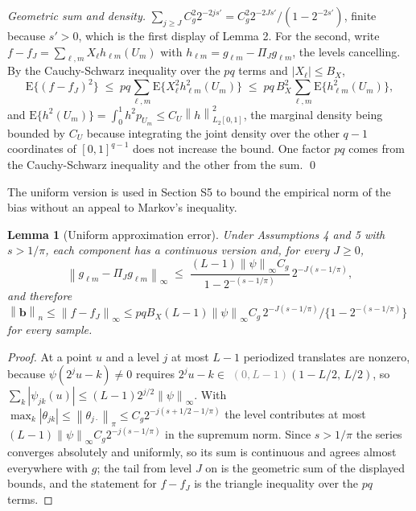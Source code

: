 \documentclass[10pt]{book}
\newtheorem{lemma}{Lemma}[section]
\theoremstyle{definition}
\newcommand{\E}{\mathrm{E}}
\newcommand{\norm}[1]{\left\lVert #1 \right\rVert}
\newcommand{\normn}[1]{\left\lVert #1 \right\rVert_{n}}
\newcommand{\cv}{\ell}
\newcommand{\md}{m}
\newcommand{\lev}{j}
\newcommand{\tsl}{k}
\newcommand{\gcomp}[2]{g_{#1#2}}
\newcommand{\wav}[2]{\psi_{#1#2}}
\newcommand{\PiJ}{\Pi_{J}}
\newcommand{\seff}{s'}
\newcommand{\bb}{\mathbf{b}}
\begin{document}
\emph{Geometric sum and density.}
$\sum_{\lev\ge J}C_g^2 2^{-2\lev\seff} = C_g^2 2^{-2J\seff}/(1-2^{-2\seff})$,
finite because $\seff > 0$, which is the first display of Lemma 2. For the
second, write $f-f_J = \sum_{\cv,\md}X_{\cv}h_{\cv\md}(U_{\md})$ with
$h_{\cv\md} = \gcomp{\cv}{\md}-\PiJ\gcomp{\cv}{\md}$, the levels cancelling.
By the Cauchy-Schwarz inequality over the $pq$ terms and
$|X_{\cv}| \le B_X$,
\[
  \E\{(f-f_J)^2\} \;\le\; pq\sum_{\cv,\md}
  \E\{X_{\cv}^2h_{\cv\md}^2(U_{\md})\}
  \;\le\; pq\,B_X^2\sum_{\cv,\md}\E\{h_{\cv\md}^2(U_{\md})\},
\]
and $\E\{h^2(U_{\md})\} = \int_0^1 h^2 p_{U_{\md}} \le C_U\norm{h}^2_{L_2[0,1]}$,
the marginal density being bounded by $C_U$ because integrating the joint
density over the other $q-1$ coordinates of $[0,1]^{q-1}$ does not increase
the bound. One factor $pq$ comes from the Cauchy-Schwarz inequality and the
other from the sum. \qed

The uniform version is used in Section S5 to bound the empirical norm of the
bias without an appeal to Markov's inequality.

\begin{lemma}[Uniform approximation error]
\label{lem:sup}
Under Assumptions 4 and 5 with $s > 1/\pi$, each component has a continuous
version and, for every $J \ge 0$,
\[
  \norm{\gcomp{\cv}{\md}-\PiJ\gcomp{\cv}{\md}}_{\infty}
  \;\le\; \frac{(L-1)\norm{\psi}_{\infty}C_g}{1-2^{-(s-1/\pi)}}\,
  2^{-J(s-1/\pi)} ,
\]
and therefore
$\normn{\bb} \le \norm{f-f_J}_{\infty} \le pq B_X(L-1)\norm{\psi}_{\infty}
C_g\,2^{-J(s-1/\pi)}/\{1-2^{-(s-1/\pi)}\}$ for every sample.
\end{lemma}

\begin{proof}
At a point $u$ and a level $\lev$ at most $L-1$ periodized translates are
nonzero, because $\psi(2^{\lev}u-\tsl)\ne0$ requires
$2^{\lev}u-\tsl \in{}$ \textcolor{gray}{\sout{$(0,L-1)$}}\textcolor{colR1}{$(1-L/2,\,L/2)$}, so
$\sum_{\tsl}|\wav{\lev}{\tsl}(u)| \le (L-1)2^{\lev/2}\norm{\psi}_{\infty}$.
With $\max_{\tsl}|\theta_{\lev\tsl}| \le \norm{\theta_{\lev\cdot}}_{\pi} \le
C_g2^{-\lev(s+1/2-1/\pi)}$ the level contributes at most
$(L-1)\norm{\psi}_{\infty}C_g2^{-\lev(s-1/\pi)}$ in the supremum norm. Since
$s > 1/\pi$ the series converges absolutely and uniformly, so its sum is
continuous and agrees almost everywhere with $g$; the tail from level $J$ on
is the geometric sum of the displayed bounds, and the statement for $f-f_J$ is
the triangle inequality over the $pq$ terms.
\end{proof}
\end{document}
